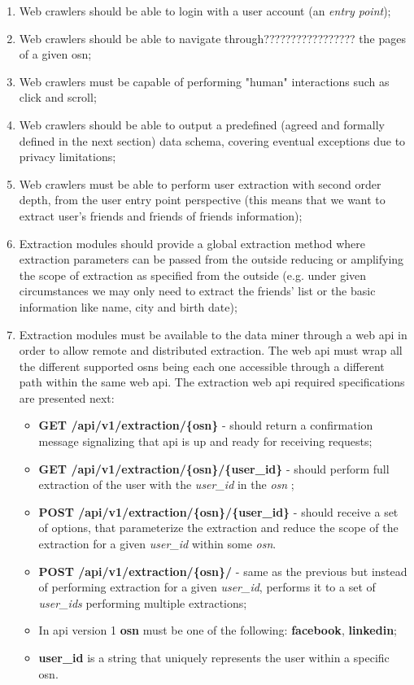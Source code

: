 \begin{enumerate}
    \item Web crawlers should be able to login with a user account (an \textit{entry point});
    \item Web crawlers should be able to navigate through????????????????? the pages of a given \gls{osn};
    \item Web crawlers must be capable of performing "human" interactions such as click and scroll;
    \item Web crawlers should be able to output a predefined (agreed and formally defined in the next section) data schema, covering eventual
    exceptions due to privacy limitations;
    \item Web crawlers must be able to perform user extraction with second order depth, from the user entry point perspective (this means that we want to extract user's friends and friends of friends information);
    \item Extraction modules should provide a global extraction method where extraction parameters can be passed from the outside reducing or amplifying the scope of extraction as specified from the outside (e.g. under given circumstances we may only need to extract the friends' list or the basic information like name, city and birth date);
    \item Extraction modules must be available to the data miner through a web \gls{api} in order to allow remote and distributed extraction. The web \gls{api} must wrap all the different supported \glspl{osn} being each one accessible through a different path within the same web \gls{api}. The extraction web \gls{api} required specifications are presented next:
    \begin{itemize}
        \item \textbf{GET /api/v1/extraction/\{osn\}} - should return a confirmation message signalizing that \gls{api} is up and ready for receiving requests;
        \item \textbf{GET /api/v1/extraction/\{osn\}/\{user\_id\}} - should perform full extraction of the user with the \textit{user\_id} in the \textit{osn} ;
        \item \textbf{POST /api/v1/extraction/\{osn\}/\{user\_id\}} - should receive a set of options, that parameterize the extraction and reduce the scope of the extraction for a given \textit{user\_id} within some \textit{osn}.
        \item \textbf{POST /api/v1/extraction/\{osn\}/} - same as the previous but instead of performing extraction for a given \textit{user\_id}, performs it to a set of \textit{user\_ids} performing multiple extractions;
        \item In \gls{api} version 1 \textbf{osn} must be one of the following: \textbf{facebook}, \textbf{linkedin};
        \item \textbf{user\_id} is a string that uniquely represents the user within a specific \gls{osn}.
    \end{itemize}
\end{enumerate}

